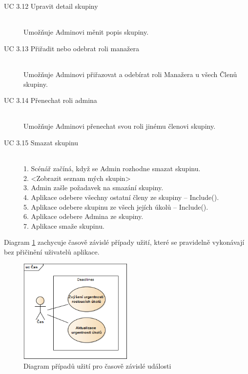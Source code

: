 \documentclass[thesis=B,czech]{FITthesis}[2012/06/26]
\begin{document}
\begin{description}
				\item[UC 3.12 Upravit detail skupiny] \hfill \\
					Umožňuje Adminovi měnit popis skupiny.
				
				\item[UC 3.13 Přiřadit nebo odebrat roli manažera] \hfill \\
					Umožňuje Adminovi přiřazovat a odebírat roli Manažera u všech Členů skupiny.
					
				\item[UC 3.14 Přenechat roli admina] \hfill \\
					Umožňuje Adminovi přenechat svou roli jinému členovi skupiny.
					
				\item[UC 3.15 Smazat skupinu] \hfill \\
					1. Scénář začíná, když se Admin rozhodne smazat skupinu. \\
					2. <Zobrazit seznam mých skupin> \\
					3. Admin zašle požadavek na smazání skupiny. \\
					4. Aplikace odebere všechny ostatní členy ze skupiny -- Include(). \\
					5. Aplikace odebere skupinu ze všech jejích úkolů -- Include(). \\
					6. Aplikace odebere Admina ze skupiny. \\
					7. Aplikace smaže skupinu. \\
					
			\end{description}
				
				
			
			Diagram \ref{diagram:uc-time} zachycuje časově závislé případy užití, které se pravidelně vykonávají bez přičinění uživatelů aplikace.
			\begin{figure}\centering
				\includegraphics[width=0.5\textwidth]{ea-diagrams/uc-time.png}
				\caption[Případy užití časových událostí]{Diagram případů užití pro časově závislé události}
				\label{diagram:uc-time}
			\end{figure}
			
\end{document}
